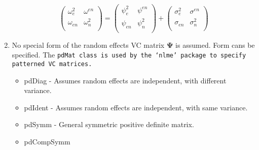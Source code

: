 \documentclass[12pt, a4paper]{article}
\begin{document}
\begin{enumerate}
\begin{equation}
\left( \begin{array}{cc}
  \omega^2_{e} & \omega^{en} \\
  \omega_{en} & \omega^2_{n} \\
\end{array}\right)
=
\left( \begin{array}{cc}
  \psi^2_{e} & \psi^{en} \\
  \psi_{en} & \psi^2_{n} \\
\end{array}\right)
+
\left( \begin{array}{cc}
  \sigma^2_{e} & \sigma^{en} \\
  \sigma_{en} & \sigma^2_{n} \\
\end{array}\right)
\end{equation}

\item  No special form of the random effects VC matrix $\boldsymbol{\Psi}$ is assumed.
Form cans be specified.
The \tt{pdMat} class is used by the `nlme' package to specify patterned VC matrices.
 \begin{itemize}
 \item pdDiag - Assumes random effects are independent, with different variance.
 \item pdIdent - Assumes random effects are independent, with same variance.
 \item pdSymm - General symmetric positive definite matrix.
 \item pdCompSymm
 \end{itemize}

\end{enumerate}










\end{document}
